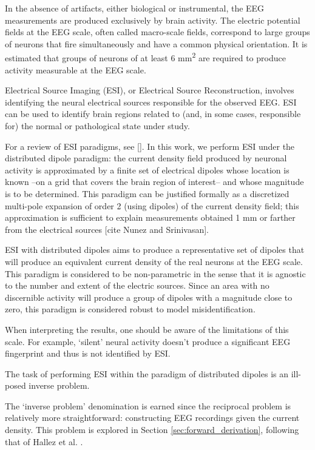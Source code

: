 In the absence of artifacts, either biological or instrumental, the EEG measurements are produced exclusively by brain activity.
%
The electric potential fields at the EEG scale, often called macro-scale fields, correspond to large groups of neurons that fire simultaneously and have a common physical orientation.
%
It is estimated that groups of neurons of at least 6 \si{mm^2} are required to produce activity measurable at the EEG scale.

Electrical Source Imaging (ESI), or Electrical Source Reconstruction, involves identifying the neural electrical sources responsible for the observed EEG.
%
ESI can be used to identify brain regions related to (and, in some cases, responsible for) the normal or pathological state under study.

For a review of ESI paradigms, see []. 
%
In this work, we perform ESI under the distributed dipole paradigm: the current density field produced by neuronal activity is approximated by a finite set of electrical dipoles whose location is known --on a grid that covers the brain region of interest-- and whose magnitude is to be determined. 
%
This paradigm can be justified formally as a discretized multi-pole expansion of order 2 (using dipoles) of the current density field; this approximation is sufficient to explain measurements obtained 1 mm or farther from the electrical sources [cite Nunez and Srinivasan].

ESI with distributed dipoles aims to produce a representative set of dipoles that will produce an equivalent current density of the real neurons at the EEG scale.
%
This paradigm is considered to be non-parametric in the sense that it is agnostic to the number and extent of the electric sources. 
%
Since an area with no discernible activity will produce a group of dipoles with a magnitude close to zero, this paradigm is considered robust to model misidentification.

When interpreting the results, one should be aware of the limitations of this scale.
%
For example, `silent' neural activity doesn't produce a significant EEG fingerprint and thus is not identified by ESI.

The task of performing ESI within the paradigm of distributed dipoles is an ill-posed inverse problem.

The `inverse problem' denomination is earned since the reciprocal problem is relatively more straightforward: constructing EEG recordings given the current density.
%
This problem is explored in Section \ref{sec:forward_derivation}, following that of Hallez et al. \cite{hallez2007review}.

